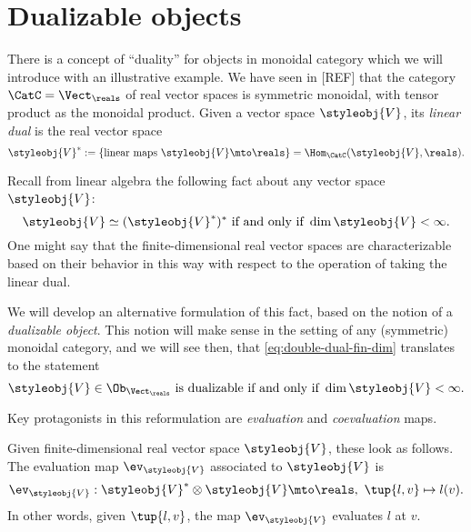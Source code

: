 

\section{Dualizable objects}
\label{sec:dual-objects}

There is a concept of ``duality'' for objects in monoidal category which we will introduce with an illustrative example. We have seen in [REF] that the category $\CatC = \Vect_{\reals}$ of real vector spaces is symmetric monoidal, with tensor product as the monoidal product. Given a vector space $\styleobj{V} $, its \emph{linear dual} is the real vector space
\begin{equation}\label{eq:lin-dual-vecsp}
\styleobj{V} ^{*} := \{ \text{linear maps } \styleobj{V} \mto \reals \} = \Hom_{\CatC}(\styleobj{V}, \reals). 
\end{equation}

Recall from linear algebra the following fact about any vector space $\styleobj{V} $: 
\begin{equation}\label{eq:double-dual-fin-dim}
\styleobj{V}  \simeq (\styleobj{V} ^{*})^* \text{ if and only if } \dim \styleobj{V}  < \infty.  
\end{equation}
One might say that the finite-dimensional real vector spaces are characterizable based on their behavior in this way with respect to the operation of taking the linear dual. 

We will develop an alternative formulation of this fact, based on the notion of a \emph{dualizable object}. This notion will make sense in the setting of any (symmetric) monoidal category, and we will see then, that \cref{eq:double-dual-fin-dim} translates to the statement
\begin{equation}\label{eq:dualizable-fin-dim}
\styleobj{V}  \in \Ob_{\Vect_\reals} \text{ is dualizable if and only if } \dim \styleobj{V}  < \infty.  
\end{equation}

Key protagonists in this reformulation are \emph{evaluation} and \emph{coevaluation} maps. 

Given finite-dimensional real vector space $\styleobj{V} $, these look as follows. The evaluation map $\ev_\styleobj{V} $ associated to $\styleobj{V} $ is
\begin{equation}\label{eq:evaluation-vecsp}
\ev_\styleobj{V}  : \styleobj{V}^* \otimes \styleobj{V}  \mto \reals, \ \tup{l, v} \mapsto l(v).
\end{equation}
In other words, given $\tup{l, v}$, the map $\ev_\styleobj{V} $ evaluates $l$ at $v$. 

